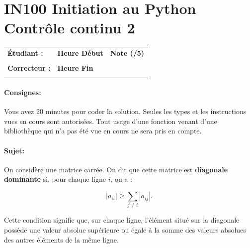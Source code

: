 \documentclass[a4paper,11pt]{article}
\begin{document}
\newtheorem{theo}{Theorem}
\newtheorem{coro}{Corollary}[theo]
\newtheorem{lemme}{Lemma}
\renewcommand{\thecoro}{\thetheo.\arabic{coro}}



\parindent=0cm


\section*{\center IN100 Initiation au Python\\
Contrôle continu 2}

\vspace{-0.3 cm}

\begin{table}[h!]
\centering
\renewcommand{\arraystretch}{1.4} %
\begin{tabular}{|p{10cm}|p{3cm}|p{2cm}|}
\hline
\textbf{Étudiant :} & \textbf{Heure Début }  & \textbf{Note (/5) }  \\
& & \\
\hline
\textbf{Correcteur :} & \textbf{Heure Fin } & \\
& & \\
\hline

\hline
\end{tabular}
\end{table}
\vspace{-0.4 cm}
\paragraph*{Consignes:} Vous avez 20 minutes pour coder la solution. Seules les types et les instructions vues en cours sont autorisées. Tout usage d'une fonction 
venant d'une bibliothèque qui n'a pas été vue en cours ne sera pris en compte. 

\vspace{-0.2 cm}
\vspace{-0.2 cm}
\paragraph*{Sujet:}

On considère une matrice carrée.  
On dit que cette matrice est \textbf{diagonale dominante} si, pour chaque ligne $i$, on a :

\[
|a_{ii}| \ge \sum_{j \neq i} |a_{ij}|.
\]

Cette condition signifie que, sur chaque ligne, l'élément situé sur la diagonale possède une valeur absolue supérieure ou égale à la somme des valeurs absolues des autres éléments de la même ligne. 
\end{document}

